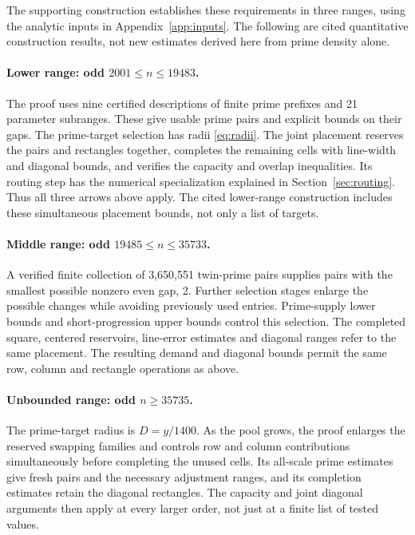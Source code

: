 \documentclass[11pt]{article}
\theoremstyle{definition}
\begin{document}
The supporting construction \cite[Sections 3--4]{Companion} establishes these
requirements in three ranges, using the analytic inputs in
Appendix~\ref{app:inputs}. The following are cited quantitative construction
results, not new estimates derived here from prime density alone.

\paragraph{Lower range: odd \(2001\le n\le19483\).}
The proof uses nine certified descriptions of finite prime prefixes and 21
parameter subranges. These give usable prime pairs and explicit bounds on
their gaps. The prime-target selection has radii \eqref{eq:radii}. The joint
placement reserves the pairs and rectangles together, completes the remaining
cells with line-width and diagonal bounds, and verifies the capacity and
overlap inequalities. Its routing step has the numerical specialization
explained in Section~\ref{sec:routing}. Thus all three arrows above apply.
The cited lower-range construction includes these simultaneous placement
bounds, not only a list of targets.

\paragraph{Middle range: odd \(19485\le n\le35733\).}
A verified finite collection of 3,650,551 twin-prime pairs supplies pairs with
the smallest possible nonzero even gap, 2. Further selection stages enlarge
the possible changes while avoiding previously used entries. Prime-supply
lower bounds and short-progression upper bounds control this selection.
The completed square, centered reservoirs, line-error estimates and diagonal
ranges refer to the same placement. The resulting demand and diagonal bounds
permit the same row, column and rectangle operations as above.

\paragraph{Unbounded range: odd \(n\ge35735\).}
The prime-target radius is \(D=y/1400\). As the pool grows, the proof enlarges
the reserved swapping families and controls row and column contributions
simultaneously before completing the unused cells. Its all-scale prime
estimates give fresh pairs and the necessary adjustment ranges, and its
completion estimates retain the diagonal rectangles. The capacity and joint
diagonal arguments then apply at every larger order, not just at a finite
list of tested values.
\end{document}
